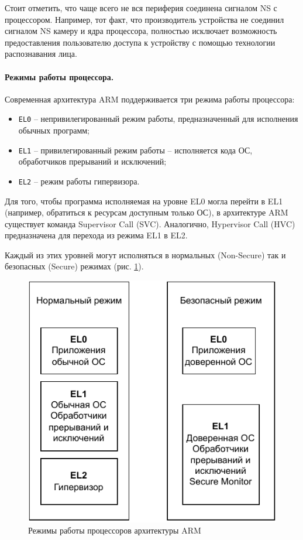Стоит отметить, что чаще всего не вся периферия соединена сигналом NS с процессором. Например, тот факт, что производитель устройства не соединил сигналом NS камеру и ядра процессора, полностью исключает возможность предоставления пользователю доступа к устройству с помощью технологии распознавания лица.

\paragraph{Режимы работы процессора.}\label{arm-proc}

Современная архитектура ARM поддерживается три режима работы процессора: 

\begin{itemize}
	\item \texttt{EL0} -- непривилегированный режим работы, предназначенный для исполнения обычных программ;
	\item \texttt{EL1} -- привилегированный режим работы -- исполняется кода ОС, обработчиков прерываний и исключений;
	\item \texttt{EL2} -- режим работы гипервизора.
\end{itemize}

Для того, чтобы программа исполняемая на уровне EL0 могла перейти в EL1 (например, обратиться к ресурсам доступным только ОС), в архитектуре ARM существует команда Supervisor Call (SVC). Аналогично, Hypervisor Call (HVC) предназначена для перехода из режима EL1 в EL2.

Каждый из этих уровней могут исполняться в нормальных (Non-Secure) так и безопасных (Secure) режимах (рис. \ref{fig:arm-levels}).

\begin{figure}[h]
	\centering
	\includegraphics[width=\textwidth]{img/arm-levels.pdf}
	\caption{Режимы работы процессоров архитектуры ARM}
	\label{fig:arm-levels}
\end{figure}

